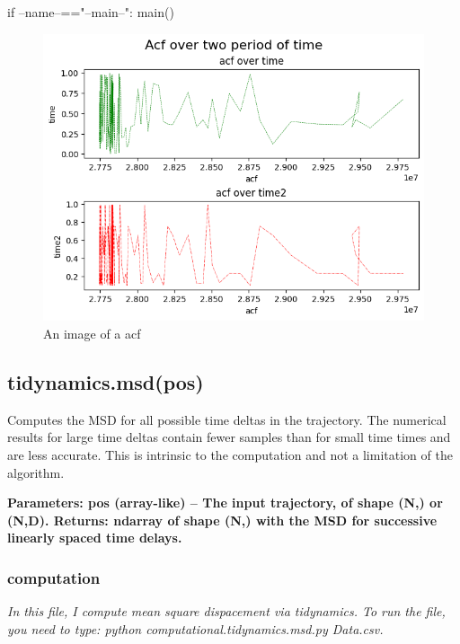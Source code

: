 \documentclass[12pt, a4paper, twoside]{report}
\begin{document}
if --name--=="--main--":\newline
\hspace*{10mm}     main()  \newpage


\begin{figure}[htp]
    \centering
    \includegraphics[width=17cm]{acf1.png}
    \caption{An image of a acf}
    \label{fig:acf}
\end{figure}\newpage



\subsection{tidynamics.msd(pos)}

Computes the MSD for all possible time deltas in the trajectory. The numerical results for large time deltas contain fewer samples than for small time times and are less accurate. This is intrinsic to the computation and not a limitation of the algorithm.


\textbf{
Parameters:	pos (array-like) – The input trajectory, of shape (N,) or (N,D).\newline
Returns:	ndarray of shape (N,) with the MSD for successive linearly spaced time delays.}

\subsubsection{computation}


\textit{In this file, I compute mean square dispacement via tidynamics.\newline
To run the file, you need to type: python  computational.tidynamics.msd.py Data.csv.}\newline
\end{document}
